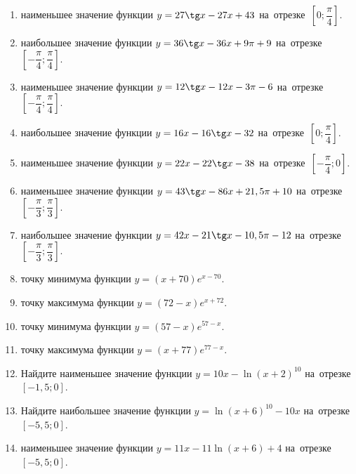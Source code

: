 \documentclass[a4paper,10pt]{article}
\begin{document}
\begin{enumerate}
\item {} наименьшее значение функции $y = 27\tg x-27x+43$ на~отрезке~$\left[0;\dfrac{\pi }{4}\right]$.

\item {} наибольшее значение функции $y=36\tg x-36x+9\pi +9$ на~отрезке~$\left[-\dfrac{\pi }{4};\dfrac{\pi }{4}\right]$.

\item {} наименьшее значение функции $y=12\tg x-12x-3\pi -6$ на~отрезке~$\left[-\dfrac{\pi }{4};\dfrac{\pi }{4}\right]$.

\item {} наибольшее значение функции $y = 16x-16\tg x -32$ на~отрезке~$\left[0;\dfrac{\pi }{4}\right]$.

\item {} наименьшее значение функции $y = 22x-22\tg x -38$ на~отрезке~$\left[-\dfrac{\pi }{4};0\right]$.

\item {} наименьшее значение функции $y = 43\tg x-86x+21,5 \pi +10$ на~отрезке~$\left[-\dfrac{\pi }{3};\dfrac{\pi }{3}\right]$.

\item {} наибольшее значение функции $y = 42x-21\tg x-10,5\pi -12$ на~отрезке~$\left[-\dfrac{\pi }{3};\dfrac{\pi }{3}\right]$.

\item {} точку минимума функции $y = \left(x+70\right)e^{x-70}$.

\item {} точку максимума функции $y = \left(72-x\right)e^{x+72}$.

\item {} точку минимума функции $y = \left(57-x\right)e^{57-x}$.

\item {} точку максимума функции $y = \left(x+77\right)e^{77-x}$.

\item Найдите наименьшее значение функции $y = 10x-\ln \left(x+2\right)^{10}$ на~отрезке~$\left[-1,5;0\right]$.

\item Найдите наибольшее значение функции $y = \ln \left(x+6\right)^{10}-10x$ на~отрезке~$\left[-5,5;0\right]$.

\item {} наименьшее значение функции $y = 11x-11\ln \left(x+6\right) +4$ на~отрезке~$\left[-5,5;0\right]$.


\end{enumerate}
\end{document}

